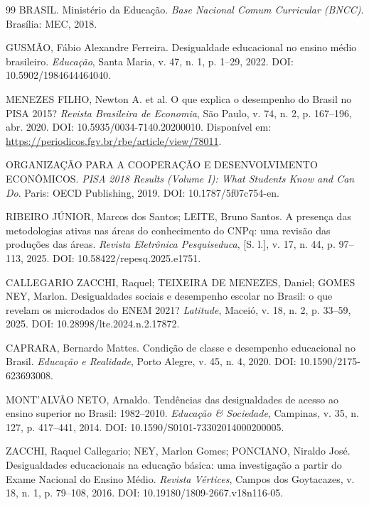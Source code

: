 \begin{thebibliography}{99}
BRASIL. Ministério da Educação. \textit{Base Nacional Comum Curricular (BNCC)}. Brasília: MEC, 2018.

GUSMÃO, Fábio Alexandre Ferreira. Desigualdade educacional no ensino médio brasileiro. \textit{Educação}, Santa Maria, v. 47, n. 1, p. 1--29, 2022. DOI: 10.5902/1984644464040.

MENEZES FILHO, Newton A. et al. O que explica o desempenho do Brasil no PISA 2015? \textit{Revista Brasileira de Economia}, São Paulo, v. 74, n. 2, p. 167--196, abr. 2020. DOI: 10.5935/0034-7140.20200010. Disponível em: \url{https://periodicos.fgv.br/rbe/article/view/78011}.

ORGANIZAÇÃO PARA A COOPERAÇÃO E DESENVOLVIMENTO ECONÔMICOS. \textit{PISA 2018 Results (Volume I): What Students Know and Can Do}. Paris: OECD Publishing, 2019. DOI: 10.1787/5f07c754-en.

RIBEIRO JÚNIOR, Marcos dos Santos; LEITE, Bruno Santos. A presença das metodologias ativas nas áreas do conhecimento do CNPq: uma revisão das produções das áreas. \textit{Revista Eletrônica Pesquiseduca}, [S. l.], v. 17, n. 44, p. 97--113, 2025. DOI: 10.58422/repesq.2025.e1751.


CALLEGARIO ZACCHI, Raquel; TEIXEIRA DE MENEZES, Daniel; GOMES NEY, Marlon. Desigualdades sociais e desempenho escolar no Brasil: o que revelam os microdados do ENEM 2021? \textit{Latitude}, Maceió, v. 18, n. 2, p. 33--59, 2025. DOI: 10.28998/lte.2024.n.2.17872.

CAPRARA, Bernardo Mattes. Condição de classe e desempenho educacional no Brasil. \textit{Educação e Realidade}, Porto Alegre, v. 45, n. 4, 2020. DOI: 10.1590/2175-623693008.

MONT'ALVÃO NETO, Arnaldo. Tendências das desigualdades de acesso ao ensino superior no Brasil: 1982--2010. \textit{Educação \& Sociedade}, Campinas, v. 35, n. 127, p. 417--441, 2014. DOI: 10.1590/S0101-73302014000200005.

ZACCHI, Raquel Callegario; NEY, Marlon Gomes; PONCIANO, Niraldo José. Desigualdades educacionais na educação básica: uma investigação a partir do Exame Nacional do Ensino Médio. \textit{Revista Vértices}, Campos dos Goytacazes, v. 18, n. 1, p. 79--108, 2016. DOI: 10.19180/1809-2667.v18n116-05.


\end{thebibliography}
